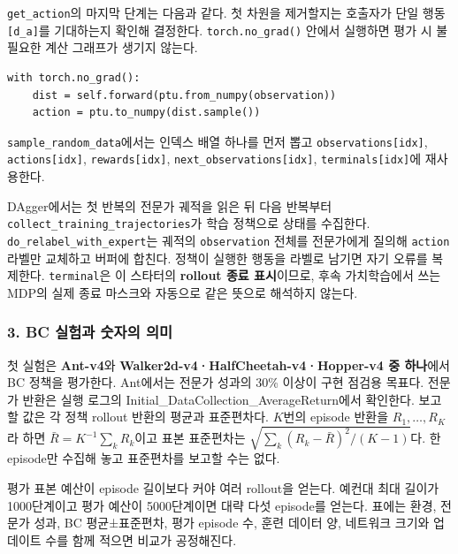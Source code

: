 \documentclass[11pt,a4paper]{article}
\begin{document}
\texttt{get\_\allowbreak{}action}의 마지막 단계는 다음과 같다. 첫 차원을 제거할지는 호출자가 단일 행동 \texttt{[d\_\allowbreak{}a]}를 기대하는지 확인해 결정한다. \texttt{torch.\allowbreak{}no\_\allowbreak{}grad()} 안에서 실행하면 평가 시 불필요한 계산 그래프가 생기지 않는다.\par

\begin{verbatim}
with torch.no_grad():
    dist = self.forward(ptu.from_numpy(observation))
    action = ptu.to_numpy(dist.sample())
\end{verbatim}

\texttt{sample\_\allowbreak{}random\_\allowbreak{}data}에서는 인덱스 배열 하나를 먼저 뽑고 \texttt{observations[idx]}, \texttt{actions[idx]}, \texttt{rewards[idx]}, \texttt{next\_\allowbreak{}observations[idx]}, \texttt{terminals[idx]}에 재사용한다.\par

DAgger에서는 첫 반복의 전문가 궤적을 읽은 뒤 다음 반복부터 \texttt{collect\_\allowbreak{}training\_\allowbreak{}trajectories}가 학습 정책으로 상태를 수집한다. \texttt{do\_\allowbreak{}relabel\_\allowbreak{}with\_\allowbreak{}expert}는 궤적의 \texttt{observation} 전체를 전문가에게 질의해 \texttt{action} 라벨만 교체하고 버퍼에 합친다. 정책이 실행한 행동을 라벨로 남기면 자기 오류를 복제한다. \texttt{terminal}은 이 스타터의 \textbf{rollout 종료 표시}이므로, 후속 가치학습에서 쓰는 MDP의 실제 종료 마스크와 자동으로 같은 뜻으로 해석하지 않는다.\par

\subsubsection{3. BC 실험과 숫자의 의미}

첫 실험은 \textbf{Ant-v4}와 \textbf{Walker2d-v4·HalfCheetah-v4·Hopper-v4 중 하나}에서 BC 정책을 평가한다. Ant에서는 전문가 성과의 30\% 이상이 구현 점검용 목표다. 전문가 반환은 실행 로그의 Initial\_DataCollection\_AverageReturn에서 확인한다. 보고할 값은 각 정책 rollout 반환의 평균과 표준편차다. $K$번의 episode 반환을 $R_1,\ldots,R_K$라 하면 $\bar R=K^{-1}\sum_kR_k$이고 표본 표준편차는 $\sqrt{\sum_k(R_k-\bar R)^2/(K-1)}$다. 한 episode만 수집해 놓고 표준편차를 보고할 수는 없다.\par

평가 표본 예산이 episode 길이보다 커야 여러 rollout을 얻는다. 예컨대 최대 길이가 1000단계이고 평가 예산이 5000단계이면 대략 다섯 episode를 얻는다. 표에는 환경, 전문가 성과, BC 평균±표준편차, 평가 episode 수, 훈련 데이터 양, 네트워크 크기와 업데이트 수를 함께 적으면 비교가 공정해진다.\par
\end{document}
